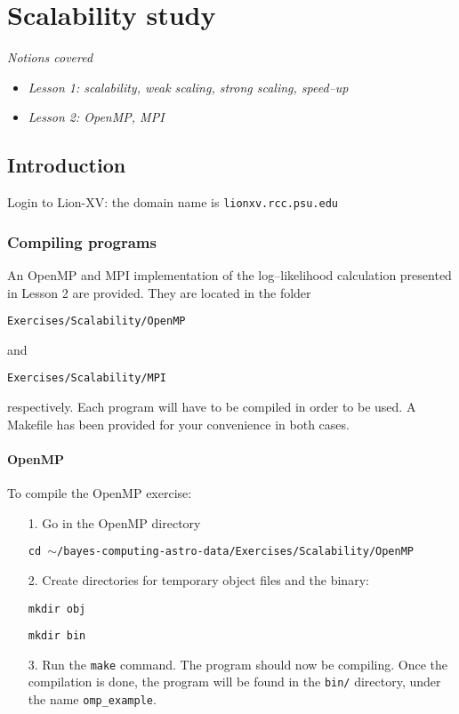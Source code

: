 \documentclass[letterpaper,10pt]{article}
\begin{document}
\newpage












\section{Scalability study}
\textit{Notions covered}
\begin{itemize}
 \item \textit{Lesson 1: scalability, weak scaling, strong scaling, speed--up}
 \item \textit{Lesson 2: OpenMP, MPI }
\end{itemize}

\subsection{Introduction}
Login to Lion-XV: the domain name is \texttt{lionxv.rcc.psu.edu}


\subsubsection{Compiling programs}
An OpenMP and MPI implementation of the log--likelihood calculation presented in Lesson 2 are provided. They are located in the folder
\begin{center}
 \texttt{Exercises/Scalability/OpenMP}
\end{center}
and 
\begin{center}
 \texttt{Exercises/Scalability/MPI}
\end{center}
respectively.
Each program will have to be compiled in order to be used. A Makefile has been provided for your convenience in both cases.
\paragraph{OpenMP} To compile the OpenMP exercise:
\begin{itemize}
 \item[1.] Go in the OpenMP directory 
\begin{center}
 \texttt{cd $\sim$/bayes-computing-astro-data/Exercises/Scalability/OpenMP}
\end{center}
 \item[2.] Create directories for temporary object files and the binary:
\begin{center}
 \texttt{mkdir obj}
\end{center}
\begin{center}
 \texttt{mkdir bin}
\end{center} 
 
\item[3.] Run the \texttt{make} command. The program should now be compiling. Once the compilation is done, the program will be found in the \texttt{bin/} directory, under the name \texttt{omp\_example}.
\end{itemize}
\end{document}
